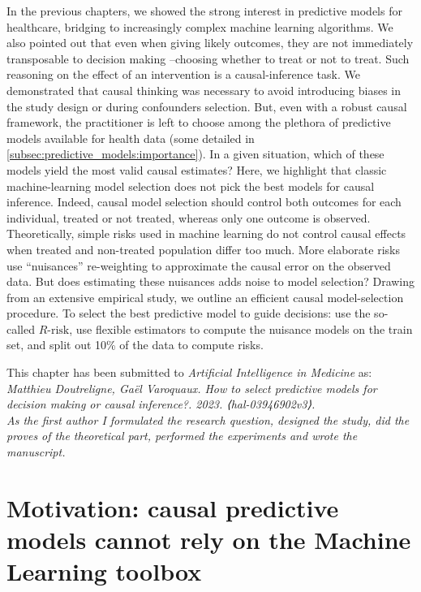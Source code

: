 \documentclass{report}
\begin{document}
In the previous chapters, we showed the strong interest in predictive models for
healthcare, bridging to increasingly complex machine learning algorithms. We
also pointed out that even when giving likely outcomes, they are not immediately
transposable to decision making --choosing whether to treat or not to treat.
Such reasoning on the effect of an intervention is a causal-inference task. We
demonstrated that causal thinking was necessary to avoid introducing biases in
the study design or during confounders selection.
But, even with a robust causal framework, the practitioner is left to choose among
the plethora of predictive models available for health data (some detailed in
\ref{subsec:predictive_models:importance}). In a given situation, which of these
models yield the most valid causal estimates?
Here, we highlight that classic machine-learning model selection does not pick
the best models for causal inference. Indeed, causal model selection should
control both outcomes for each individual, treated or not treated, whereas only
one outcome is observed.
Theoretically, simple risks used in machine learning do not control causal
effects when treated and non-treated population differ too much. More elaborate
risks use ``nuisances'' re-weighting to approximate the causal error on the
observed data. But does estimating these nuisances adds noise to model selection?
Drawing from an extensive empirical study, we outline an efficient causal
model-selection procedure. To select the best predictive model to guide
decisions: use the so-called $R\text{-risk}$, use flexible estimators to compute
the nuisance models on the train set, and split out 10\% of the data to compute
risks.


\vfill
This chapter has been submitted to \textit{Artificial Intelligence in Medicine} as:
\\ \textit{Matthieu Doutreligne, Gaël Varoquaux. How to select predictive models for
  decision making or causal inference?. 2023. ⟨hal-03946902v3⟩. \\
  As the first author I formulated the research question, designed the study, did the proves
  of the theoretical part, performed the experiments and wrote the manuscript.}

\clearpage
\section{Motivation: causal predictive models cannot rely on the Machine Learning
  toolbox}\label{sec:causal_model_selection:motivation}
\end{document}
